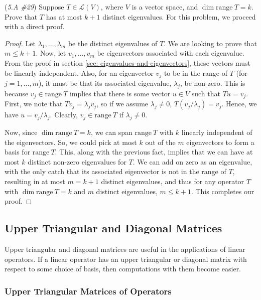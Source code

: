 \documentclass{article}
\renewcommand{\L}{\mathcal{L}}
\newcommand{\range}{\mathrm{range}\ }
\theoremstyle{definition}
\begin{document}
\begin{problem}{(\textit{5.A \#29}) Suppose $T \in \L(V)$, where $V$ is a vector space, and $\dim \range T = k$. Prove that $T$ has at most $k + 1$ distinct eigenvalues.}
    For this problem, we proceed with a direct proof.
    \begin{proof}
        Let $\lambda_1, \dots, \lambda_m$ be the distinct eigenvalues of $T$. We are looking to prove that $m \leq k + 1$. Now, let $v_1, \dots, v_m$ be eigenvectors associated with each eigenvalue. From the proof in section \ref{sec: eigenvalues-and-eigenvectors}, these vectors must be linearly independent. Also, for an eigenvector $v_j$ to be in the range of $T$ (for $j = 1, \dots, m$), it must be that its associated eigenvalue, $\lambda_j$, be non-zero. This is because $v_j \in \range T$ implies that there is some vector $u \in V$ such that $Tu = v_j$. First, we note that $Tv_j = \lambda_jv_j$, so if we assume $\lambda_j \neq 0$, $T(v_j/\lambda_j) = v_j$. Hence, we have $u = v_j/\lambda_j$. Clearly, $v_j \in \range T$ if $\lambda_j \neq 0$.

        Now, since $\dim \range T = k$, we can span $\range T$ with $k$ linearly independent of the eigenvectors. So, we could pick at most $k$ out of the $m$ eigenvectors to form a basis for $\range T$. This, along with the previous fact, implies that we can have at most $k$ distinct non-zero eigenvalues for $T$. We can add on zero as an eigenvalue, with the only catch that its associated eigenvector is not in the range of $T$, resulting in at most $m = k + 1$ distinct eigenvalues, and thus for any operator $T$ with $\dim \range T = k$ and $m$ distinct eigenvalues, $m \leq k + 1$. This completes our proof.
    \end{proof}
\end{problem}

\subsection{Upper Triangular and Diagonal Matrices}

Upper triangular and diagonal matrices are useful in the applications of linear operators. If a linear operator has an upper triangular or diagonal matrix with respect to some choice of basis, then computations with them become easier.

\subsubsection{Upper Triangular Matrices of Operators}
\label{sec: upper-triangular}
\end{document}
